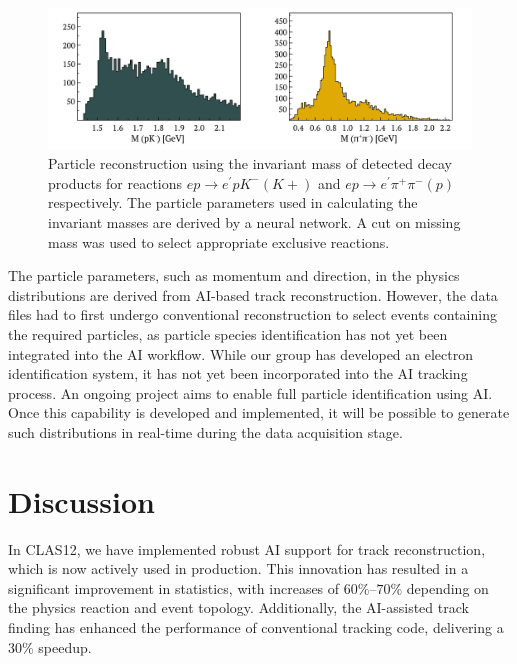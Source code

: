 \documentclass[preprint,12pt]{elsarticle}
\begin{document}
\begin{figure}[h!]
\centering
\includegraphics[width=0.85\columnwidth]{images/figure_lambda_instarec.pdf}
\caption{Particle reconstruction using the invariant mass of detected decay products for reactions $ep\rightarrow e^\prime p K^- (K+)$ and $ep\rightarrow e^\prime\pi^+\pi^-(p)$ respectively. The particle parameters used in calculating the invariant masses are derived by a neural network. A cut on missing mass was used to select appropriate exclusive reactions.} 
\label{fig:ai_instarec}
\end{figure}

The particle parameters, such as momentum and direction, in the physics distributions are derived from AI-based track reconstruction. However, the data files had to first undergo conventional reconstruction to select events containing the required particles, as particle species identification has not yet been integrated into the AI workflow. While our group has developed an electron identification system, it has not yet been incorporated into the AI tracking process. An ongoing project aims to enable full particle identification using AI. Once this capability is developed and implemented, it will be possible to generate such distributions in real-time during the data acquisition stage.


\section{Discussion}
In CLAS12, we have implemented robust AI support for track reconstruction, which is now actively used in production. This innovation has resulted in a significant improvement in statistics, with increases of $60\%–70\%$ depending on the physics reaction and event topology. Additionally, the AI-assisted track finding has enhanced the performance of conventional tracking code, delivering a $30\%$ speedup.
\end{document}
